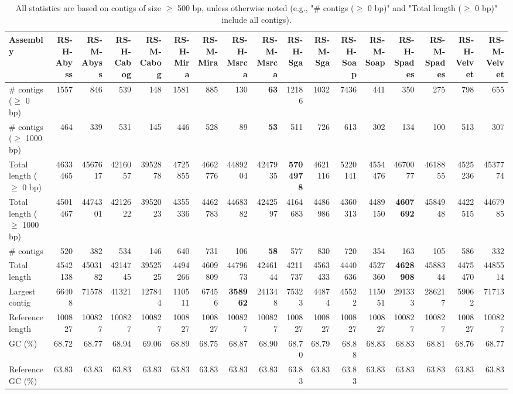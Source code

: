 \documentclass[12pt,a4paper]{article}
\begin{document}
\begin{table}[ht]
\begin{center}
\caption{All statistics are based on contigs of size $\geq$ 500 bp, unless otherwise noted (e.g., "\# contigs ($\geq$ 0 bp)" and "Total length ($\geq$ 0 bp)" include all contigs).}
\begin{tabular}{|l*{16}{|r}|}
\hline
Assembly & RS-H-Abyss & RS-M-Abyss & RS-H-Cabog & RS-M-Cabog & RS-H-Mira & RS-M-Mira & RS-H-Msrca & RS-M-Msrca & RS-H-Sga & RS-M-Sga & RS-H-Soap & RS-M-Soap & RS-H-Spades & RS-M-Spades & RS-H-Velvet & RS-M-Velvet \\ \hline
\# contigs ($\geq$ 0 bp) & 1557 & 846 & 539 & 148 & 1581 & 885 & 130 & {\bf 63} & 12186 & 1032 & 7436 & 441 & 350 & 275 & 798 & 655 \\ \hline
\# contigs ($\geq$ 1000 bp) & 464 & 339 & 531 & 145 & 446 & 528 & 89 & {\bf 53} & 511 & 726 & 613 & 302 & 134 & 100 & 513 & 307 \\ \hline
Total length ($\geq$ 0 bp) & 4633465 & 4567617 & 4216057 & 3952878 & 4725855 & 4662776 & 4489204 & 4247935 & {\bf 5704978} & 4621116 & 5220141 & 4554476 & 4670077 & 4618855 & 4525236 & 4537774 \\ \hline
Total length ($\geq$ 1000 bp) & 4501467 & 4474301 & 4212622 & 3952023 & 4355336 & 4462783 & 4468382 & 4242597 & 4164683 & 4486986 & 4360313 & 4489150 & {\bf 4607692} & 4584948 & 4422515 & 4467985 \\ \hline
\# contigs & 520 & 382 & 534 & 146 & 640 & 731 & 106 & {\bf 58} & 577 & 830 & 720 & 354 & 163 & 105 & 586 & 332 \\ \hline
Total length & 4542138 & 4503182 & 4214745 & 3952525 & 4494266 & 4609809 & 4479673 & 4246144 & 4211737 & 4563433 & 4440636 & 4527360 & {\bf 4628908} & 4588344 & 4475470 & 4485514 \\ \hline
Largest contig & 66408 & 71578 & 41321 & 127844 & 110511 & 67456 & {\bf 358962} & 241348 & 75323 & 44874 & 45522 & 115051 & 291333 & 286217 & 59062 & 71713 \\ \hline
Reference length & 100827 & 100827 & 100827 & 100827 & 100827 & 100827 & 100827 & 100827 & 100827 & 100827 & 100827 & 100827 & 100827 & 100827 & 100827 & 100827 \\ \hline
GC (\%) & 68.72 & 68.77 & 68.94 & 69.06 & 68.89 & 68.75 & 68.87 & 68.90 & 68.70 & 68.79 & 68.88 & 68.83 & 68.83 & 68.81 & 68.76 & 68.77 \\ \hline
Reference GC (\%) & 63.83 & 63.83 & 63.83 & 63.83 & 63.83 & 63.83 & 63.83 & 63.83 & 63.83 & 63.83 & 63.83 & 63.83 & 63.83 & 63.83 & 63.83 & 63.83 \\ \hline

\end{tabular}
\end{center}
\end{table}
\end{document}
